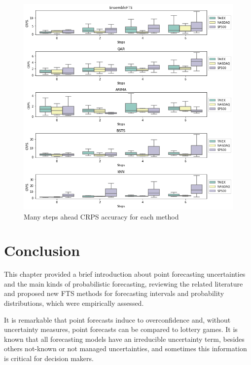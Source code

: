 \begin{figure}[htb]
    \centering
    \includegraphics[width=\textwidth]{figures/probabilistic_many_steps.png}
    \caption{Many steps ahead CRPS accuracy for each method}
    \label{fig:probabilistic_many_steps}
\end{figure}


%
\section{Conclusion}
\label{sec:prob_conclusion}

This chapter provided a brief introduction about point forecasting uncertainties and the main kinds of probabilistic forecasting, reviewing the related literature and proposed new FTS methods for forecasting intervals and probability distributions, which were empirically assessed.

It is remarkable that point forecasts induce to overconfidence and,  without uncertainty measures, point forecasts can be compared to lottery games. It is known that all forecasting models have an irreducible uncertainty term, besides others not-known or not managed uncertainties, and sometimes this information is critical for decision makers.


